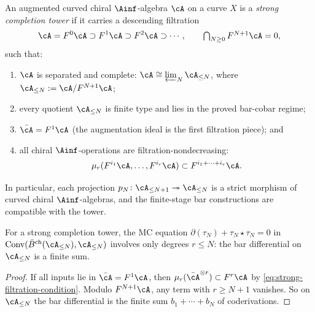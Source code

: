 \begin{definition}
\label{def:strong-completion-tower}
An augmented curved chiral $\Ainf$-algebra $\cA$ on a curve $X$ is a
\emph{strong completion tower} if it carries a descending filtration
\[
\cA = F^0\cA \supset F^1\cA \supset F^2\cA \supset \cdots,
\qquad
\textstyle\bigcap_{N \ge 0} F^{N+1}\cA = 0,
\]
such that:
\begin{enumerate}
\item $\cA$ is separated and complete:
 $\cA \cong \varprojlim_N \cA_{\le N}$, where
 $\cA_{\le N} := \cA/F^{N+1}\cA$;
\item every quotient $\cA_{\le N}$ is finite type and lies in the proved
 bar-cobar regime;
\item $\bar\cA = F^1\cA$ (the augmentation ideal is the first filtration
 piece); and
\item all chiral $\Ainf$-operations are filtration-nondecreasing:
 \begin{equation}\label{eq:strong-filtration-condition}
 \mu_r(F^{i_1}\cA, \dots, F^{i_r}\cA)
 \subset F^{i_1+\cdots+i_r}\cA.
 \end{equation}
\end{enumerate}
In particular, each projection $p_N\colon \cA_{\le N+1} \twoheadrightarrow
\cA_{\le N}$ is a strict morphism of curved chiral $\Ainf$-algebras,
and the finite-stage bar constructions are compatible with the tower.
\end{definition}

\begin{lemma}
\label{lem:degree-cutoff}
For a strong completion tower, the MC equation
$\partial(\tau_N) + \tau_N \star \tau_N = 0$
in $\operatorname{Conv}(\bar B^{\mathrm{ch}}(\cA_{\le N}),
\cA_{\le N})$ involves only degrees $r \le N$:
the bar differential on $\cA_{\le N}$ is a finite sum.
\end{lemma}

\begin{proof}
If all inputs lie in $\bar\cA = F^1\cA$, then
$\mu_r(\bar\cA^{\otimes r}) \subset F^r\cA$ by
\eqref{eq:strong-filtration-condition}. Modulo $F^{N+1}\cA$, any term
with $r \ge N+1$ vanishes. So on $\cA_{\le N}$ the bar differential is
the finite sum $b_1 + \cdots + b_N$ of coderivations.
\end{proof}

